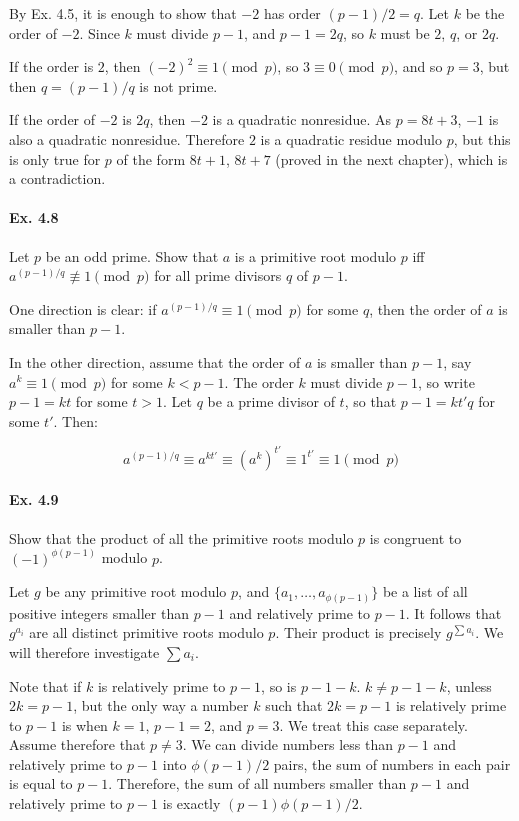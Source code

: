 \documentclass[notitlepage]{article}
\theoremstyle{definition}
\begin{document}
By Ex. 4.5, it is enough to show that $-2$ has order $(p-1)/2 =
q$. Let $k$ be the order of $-2$. Since $k$ must divide $p-1$, and
$p-1 = 2q$, so $k$ must be $2$, $q$, or $2q$.

If the order is $2$, then $(-2)^2 \equiv 1 \pmod p$, so $3 \equiv 0
\pmod p$, and so $p = 3$, but then $q = (p-1)/q$ is not prime.

If the order of $-2$ is $2q$, then $-2$ is a quadratic nonresidue. As
$p = 8t+3$, $-1$ is also a quadratic nonresidue. Therefore $2$ is a
quadratic residue modulo $p$, but this is only true for $p$ of the
form $8t+1$, $8t+7$ (proved in the next chapter), which is a
contradiction.

\paragraph{Ex. 4.8}
Let $p$ be an odd prime. Show that $a$ is a primitive root modulo $p$
iff $a^{(p-1)/q} \not \equiv 1 \pmod p$ for all prime divisors $q$ of $p - 1$.

One direction is clear: if $a^{(p-1)/q} \equiv 1 \pmod p$ for some
$q$, then the order of $a$ is smaller than $p-1$.

In the other direction, assume that the order of $a$ is smaller than
$p-1$, say $a^k \equiv 1 \pmod p$ for some $k < p-1$. The order $k$
must divide $p-1$, so write $p-1 = k t$ for some $t > 1$. Let $q$ be a
prime divisor of $t$, so that $p-1 = k t' q$ for some $t'$. Then:

\begin{equation}
  a^{(p-1)/q} \equiv a^{kt'} \equiv (a^k)^{t'} \equiv 1^{t'} \equiv 1 \pmod p
\end{equation}

\paragraph{Ex. 4.9}
Show that the product of all the primitive roots modulo $p$ is
congruent to $(-1)^{\phi(p-1)}$ modulo $p$.

Let $g$ be any primitive root modulo $p$, and $\{a_1, \ldots,
a_{\phi(p-1)}\}$ be a list of all positive integers smaller than $p-1$
and relatively prime to $p-1$. It follows that $g^{a_i}$ are all
distinct primitive roots modulo $p$. Their product is precisely
$g^{\sum a_i}$. We will therefore investigate $\sum a_i$.

Note that if $k$ is relatively prime to $p-1$, so is $p-1-k$. $k \ne
p-1-k$, unless $2k = p-1$, but the only way a number $k$ such that $2k
= p-1$ is relatively prime to $p-1$ is when $k = 1$, $p-1 = 2$, and $p
= 3$. We treat this case separately. Assume therefore that $p \ne 3$.
We can divide numbers less than $p-1$ and relatively prime to $p-1$
into $\phi(p-1)/2$ pairs, the sum of numbers in each pair is equal to
$p-1$. Therefore, the sum of all numbers smaller than $p-1$ and
relatively prime to $p-1$ is exactly $(p-1)\phi(p-1)/2$.
\end{document}
